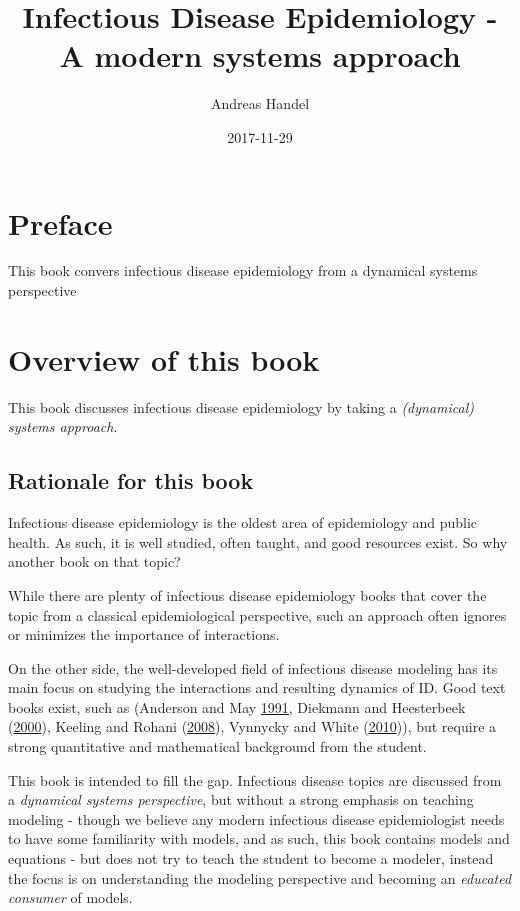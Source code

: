 \documentclass[]{article}
\title{Infectious Disease Epidemiology - A modern systems approach}
\author{Andreas Handel}
\date{2017-11-29}
\theoremstyle{definition}
\theoremstyle{definition}
\theoremstyle{definition}
\theoremstyle{remark}
\begin{document}
\maketitle

{
\setcounter{tocdepth}{2}
\tableofcontents
}
\section*{Preface}\label{preface}

This book convers infectious disease epidemiology from a dynamical
systems perspective

\section{Overview of this book}\label{overview-of-this-book}

This book discusses infectious disease epidemiology by taking a
\emph{(dynamical) systems approach}.

\subsection{Rationale for this book}\label{rationale-for-this-book}

Infectious disease epidemiology is the oldest area of epidemiology and
public health. As such, it is well studied, often taught, and good
resources exist. So why another book on that topic?

While there are plenty of infectious disease epidemiology books that
cover the topic from a classical epidemiological perspective, such an
approach often ignores or minimizes the importance of interactions.

On the other side, the well-developed field of infectious disease
modeling has its main focus on studying the interactions and resulting
dynamics of ID. Good text books exist, such as (Anderson and May
\protect\hyperlink{ref-anderson91}{1991}, Diekmann and Heesterbeek
(\protect\hyperlink{ref-diekmann00}{2000}), Keeling and Rohani
(\protect\hyperlink{ref-keeling08}{2008}), Vynnycky and White
(\protect\hyperlink{ref-vynnycky10}{2010})), but require a strong
quantitative and mathematical background from the student.

This book is intended to fill the gap. Infectious disease topics are
discussed from a \emph{dynamical systems perspective}, but without a
strong emphasis on teaching modeling - though we believe any modern
infectious disease epidemiologist needs to have some familiarity with
models, and as such, this book contains models and equations - but does
not try to teach the student to become a modeler, instead the focus is
on understanding the modeling perspective and becoming an \emph{educated
consumer} of models.
\end{document}
